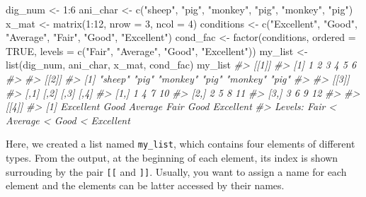 \documentclass[
]{book}
\newenvironment{Shaded}{\begin{snugshade}}{\end{snugshade}}
\newcommand{\AttributeTok}[1]{\textcolor[rgb]{0.77,0.63,0.00}{#1}}
\newcommand{\CommentTok}[1]{\textcolor[rgb]{0.56,0.35,0.01}{\textit{#1}}}
\newcommand{\ConstantTok}[1]{\textcolor[rgb]{0.00,0.00,0.00}{#1}}
\newcommand{\DecValTok}[1]{\textcolor[rgb]{0.00,0.00,0.81}{#1}}
\newcommand{\FunctionTok}[1]{\textcolor[rgb]{0.00,0.00,0.00}{#1}}
\newcommand{\NormalTok}[1]{#1}
\newcommand{\OtherTok}[1]{\textcolor[rgb]{0.56,0.35,0.01}{#1}}
\newcommand{\SpecialCharTok}[1]{\textcolor[rgb]{0.00,0.00,0.00}{#1}}
\newcommand{\StringTok}[1]{\textcolor[rgb]{0.31,0.60,0.02}{#1}}
\begin{document}
\begin{Shaded}
\begin{Highlighting}[]
\NormalTok{dig\_num }\OtherTok{\textless{}{-}} \DecValTok{1}\SpecialCharTok{:}\DecValTok{6}
\NormalTok{ani\_char }\OtherTok{\textless{}{-}} \FunctionTok{c}\NormalTok{(}\StringTok{"sheep"}\NormalTok{, }\StringTok{"pig"}\NormalTok{, }\StringTok{"monkey"}\NormalTok{, }\StringTok{"pig"}\NormalTok{, }\StringTok{"monkey"}\NormalTok{, }\StringTok{"pig"}\NormalTok{)}
\NormalTok{x\_mat }\OtherTok{\textless{}{-}} \FunctionTok{matrix}\NormalTok{(}\DecValTok{1}\SpecialCharTok{:}\DecValTok{12}\NormalTok{, }\AttributeTok{nrow =} \DecValTok{3}\NormalTok{, }\AttributeTok{ncol =} \DecValTok{4}\NormalTok{)}
\NormalTok{conditions }\OtherTok{\textless{}{-}} \FunctionTok{c}\NormalTok{(}\StringTok{"Excellent"}\NormalTok{, }\StringTok{"Good"}\NormalTok{, }\StringTok{"Average"}\NormalTok{, }\StringTok{"Fair"}\NormalTok{, }\StringTok{"Good"}\NormalTok{, }\StringTok{"Excellent"}\NormalTok{)}
\NormalTok{cond\_fac }\OtherTok{\textless{}{-}} \FunctionTok{factor}\NormalTok{(conditions, }\AttributeTok{ordered =} \ConstantTok{TRUE}\NormalTok{, }\AttributeTok{levels =} \FunctionTok{c}\NormalTok{(}\StringTok{"Fair"}\NormalTok{, }\StringTok{"Average"}\NormalTok{, }\StringTok{"Good"}\NormalTok{, }\StringTok{"Excellent"}\NormalTok{))}
\NormalTok{my\_list }\OtherTok{\textless{}{-}} \FunctionTok{list}\NormalTok{(dig\_num, ani\_char, x\_mat, cond\_fac)}
\NormalTok{my\_list}
\CommentTok{\#\textgreater{} [[1]]}
\CommentTok{\#\textgreater{} [1] 1 2 3 4 5 6}
\CommentTok{\#\textgreater{} }
\CommentTok{\#\textgreater{} [[2]]}
\CommentTok{\#\textgreater{} [1] "sheep"  "pig"    "monkey" "pig"    "monkey" "pig"   }
\CommentTok{\#\textgreater{} }
\CommentTok{\#\textgreater{} [[3]]}
\CommentTok{\#\textgreater{}      [,1] [,2] [,3] [,4]}
\CommentTok{\#\textgreater{} [1,]    1    4    7   10}
\CommentTok{\#\textgreater{} [2,]    2    5    8   11}
\CommentTok{\#\textgreater{} [3,]    3    6    9   12}
\CommentTok{\#\textgreater{} }
\CommentTok{\#\textgreater{} [[4]]}
\CommentTok{\#\textgreater{} [1] Excellent Good      Average   Fair      Good      Excellent}
\CommentTok{\#\textgreater{} Levels: Fair \textless{} Average \textless{} Good \textless{} Excellent}
\end{Highlighting}
\end{Shaded}

Here, we created a list named \texttt{my\_list}, which contains four elements of different types. From the output, at the beginning of each element, its index is shown surrouding by the pair \texttt{{[}{[}} and \texttt{{]}{]}}. Usually, you want to assign a name for each element and the elements can be latter accessed by their names.
\end{document}

